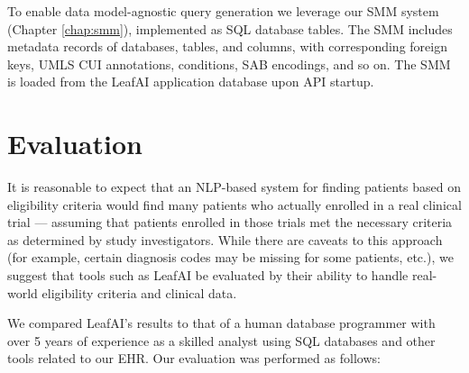 \documentclass[../main.tex]{subfiles}
\begin{document}
To enable data model-agnostic query generation we leverage our SMM system (Chapter \ref{chap:smm}), implemented as SQL database tables. The SMM includes metadata records of databases, tables, and columns, with corresponding foreign keys, UMLS CUI annotations, conditions, SAB encodings, and so on. The SMM is loaded from the LeafAI application database upon API startup.

\section{Evaluation}

It is reasonable to expect that an NLP-based system for finding patients based on eligibility criteria would find many  patients who actually enrolled in a real clinical trial — assuming  that patients enrolled in those trials met the necessary criteria as determined by study investigators. While there are caveats to this approach (for example, certain diagnosis codes may be missing for some patients, etc.), we suggest that tools such as LeafAI be evaluated by their ability to handle real-world eligibility criteria and clinical data. 

We compared LeafAI's results to that of a human database programmer with over 5 years of experience as a skilled analyst using SQL databases and other tools related to our EHR. Our evaluation was performed as follows:
\end{document}
